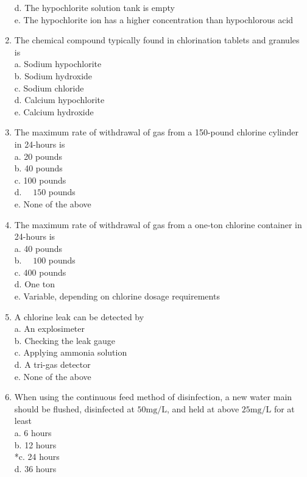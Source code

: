 \begin{enumerate}[1.]
d. The hypochlorite solution tank is empty\\
e. The hypochlorite ion has a higher concentration than hypochlorous acid\\
\item The chemical compound typically found in chlorination tablets and granules is\\
a. Sodium hypochlorite\\
b. Sodium hydroxide\\
c. Sodium chloride\\
d. Calcium hypochlorite\\
e. Calcium hydroxide\\
\item The maximum rate of withdrawal of gas from a 150-pound chlorine cylinder in 24-hours is\\
a. 20 pounds\\
b. 40 pounds\\
c. 100 pounds\\
d. $\quad 150$ pounds\\
e. None of the above\\
\item The maximum rate of withdrawal of gas from a one-ton chlorine container in 24-hours is\\
a. 40 pounds\\
b. $\quad 100$ pounds\\
c. 400 pounds\\
d. One ton\\
e. Variable, depending on chlorine dosage requirements\\
\item A chlorine leak can be detected by\\
a. An explosimeter\\
b. Checking the leak gauge\\
c. Applying ammonia solution\\
d. A tri-gas detector\\
e. None of the above\\
\item When using the continuous feed method of disinfection, a new water main should be flushed, disinfected at $50 \mathrm{mg} / \mathrm{L}$, and held at above $25 \mathrm{mg} / \mathrm{L}$ for at least\\
a. 6 hours\\
b. 12 hours\\
*c. 24 hours\\
d. 36 hours\\

\end{enumerate}
